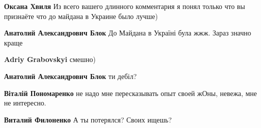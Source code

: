\begin{itemize}
\begin{itemize}
 
\textbf{Оксана Хвиля} Из всего вашего длинного комментария я понял только что вы признаёте что до майдана в Украине было лучше)

 
\textbf{Анатолий Александрович Блок} До Майдана в Україні була жжж. Зараз значно краще

 
\textbf{Adriy Grabovskyi} смешно)

 
\textbf{Анатолий Александрович Блок} ти дебіл?

 
\textbf{Віталій Пономаренко} не надо мне пересказывать опыт своей жОны, невежа, мне не интересно.

 
\textbf{Виталий Филоненко} А ты потерялся? Своих ищешь?

 

\end{itemize}
\end{itemize}
